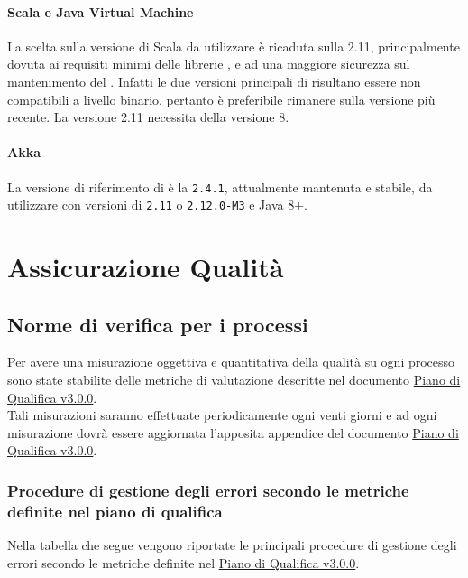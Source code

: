 \documentclass{scalatekids-article}
\begin{document}
\paragraph{Scala e Java Virtual Machine}

La scelta sulla versione di Scala da utilizzare è ricaduta sulla 
2.11, principalmente dovuta ai requisiti minimi delle librerie \textit{}, e
ad una maggiore sicurezza sul mantenimento del . Infatti le due versioni
principali di  risultano essere non compatibili a livello binario,
pertanto è preferibile rimanere sulla versione più recente. La versione 2.11
necessita della  versione 8.

\paragraph{Akka}

La versione di riferimento di  è la \verb=2.4.1=, attualmente
mantenuta e stabile, da utilizzare con versioni di  \verb=2.11= o
\verb=2.12.0-M3= e Java 8+.

\section{Assicurazione Qualità}

\subsection{Norme di verifica per i processi}

Per avere una misurazione oggettiva e quantitativa della qualità su ogni processo sono state stabilite delle metriche di valutazione descritte nel documento \href{run:../Esterni/PianoDiQualifica\_v3.0.0.pdf}{Piano di Qualifica v3.0.0}.\\Tali misurazioni saranno effettuate periodicamente ogni venti giorni e ad ogni misurazione dovrà essere aggiornata l'apposita appendice del documento \href{run:../Esterni/PianoDiQualifica\_v3.0.0.pdf}{Piano di Qualifica v3.0.0}.

\subsubsection{Procedure di gestione degli errori secondo le metriche definite nel piano di qualifica}

Nella tabella che segue vengono riportate le principali procedure di gestione degli errori secondo le metriche definite nel \href{run:../Esterni/PianoDiQualifica\_v3.0.0.pdf}{Piano di Qualifica v3.0.0}.
\end{document}
